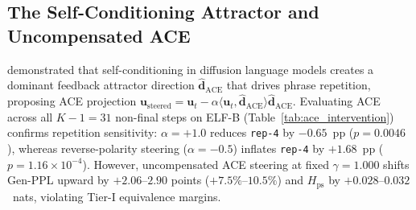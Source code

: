 \documentclass[11pt,a4paper]{article}
\begin{document}
\subsection{The Self-Conditioning Attractor and Uncompensated ACE}
\citet{zhang2026selfcond} demonstrated that self-conditioning in diffusion language models creates a dominant feedback attractor direction $\hat{\mathbf{d}}_{\mathrm{ACE}}$ that drives phrase repetition, proposing ACE projection $\mathbf{u}_{\mathrm{steered}} = \mathbf{u}_t - \alpha \langle \mathbf{u}_t, \hat{\mathbf{d}}_{\mathrm{ACE}} \rangle \hat{\mathbf{d}}_{\mathrm{ACE}}$. Evaluating ACE across all $K-1=31$ non-final steps on ELF-B (Table~\ref{tab:ace_intervention}) confirms repetition sensitivity: $\alpha = +1.0$ reduces \texttt{rep-4} by $-0.65$~pp ($p=0.0046$), whereas reverse-polarity steering ($\alpha = -0.5$) inflates \texttt{rep-4} by $+1.68$~pp ($p=1.16\times 10^{-4}$). However, uncompensated ACE steering at fixed $\gamma=1.000$ shifts Gen-PPL upward by $+2.06\text{--}2.90$ points ($+7.5\%\text{--}10.5\%$) and $H_{\mathrm{ps}}$ by $+0.028\text{--}0.032$~nats, violating Tier-I equivalence margins.
\end{document}
